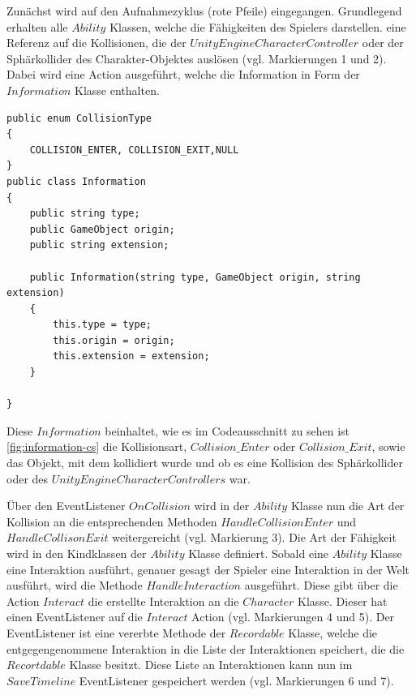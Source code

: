 Zunächst wird auf den Aufnahmezyklus (rote Pfeile) eingegangen. Grundlegend erhalten alle $Ability$ Klassen, welche die Fähigkeiten des Spielers darstellen. eine Referenz auf die Kollisionen, die der $UnityEngine CharacterController$ oder der Sphärkollider des Charakter-Objektes auslösen (vgl. Markierungen 1 und 2). Dabei wird eine Action ausgeführt, welche die Information in Form der $Information$ Klasse enthalten.

\begin{lstlisting}[caption={Information.cs Klasse}, label={fig:information-cs}]
public enum CollisionType
{
    COLLISION_ENTER, COLLISION_EXIT,NULL
}
public class Information
{
    public string type;
    public GameObject origin;
    public string extension;

    public Information(string type, GameObject origin, string extension)
    {
        this.type = type;
        this.origin = origin;
        this.extension = extension;
    }

}
\end{lstlisting}

Diese $Information$ beinhaltet, wie es im Codeausschnitt zu sehen ist \ref{fig:information-cs} die Kollisionsart, $Collision\_Enter$ oder $Collision\_Exit$, sowie das Objekt, mit dem kollidiert wurde und ob es eine Kollision des Sphärkollider oder des $UnityEngine CharacterControllers$ war. 

Über den EventListener $OnCollision$ wird in der $Ability$ Klasse nun die Art der Kollision an die entsprechenden Methoden $HandleCollisionEnter$ und $HandleCollisonExit$ weitergereicht (vgl. Markierung 3). Die Art der Fähigkeit wird in den Kindklassen der $Ability$ Klasse definiert. Sobald eine $Ability$ Klasse eine Interaktion ausführt, genauer gesagt der Spieler eine Interaktion in der Welt ausführt, wird die Methode $HandleInteraction$ ausgeführt. Diese gibt über die Action $Interact$ die erstellte Interaktion an die $Character$ Klasse. Dieser hat einen EventListener auf die $Interact$ Action (vgl. Markierungen 4 und 5). Der EventListener ist eine vererbte Methode der $Recordable$ Klasse, welche die entgegengenommene Interaktion in die Liste der Interaktionen speichert, die die $Recortdable$ Klasse besitzt. Diese Liste an Interaktionen kann nun im $SaveTimeline$ EventListener gespeichert werden (vgl. Markierungen 6 und 7).

